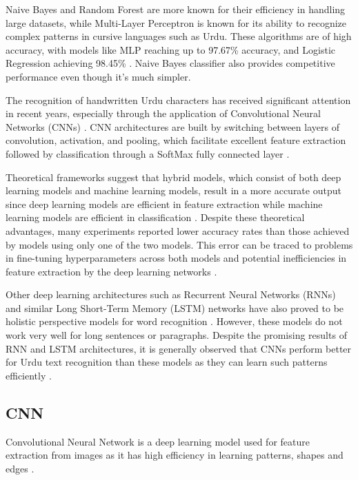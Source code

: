 \documentclass[11pt,twocolumn,twoside]{article} %
\begin{document}
Naive Bayes and Random Forest are more known for their efficiency in handling large datasets, while Multi-Layer Perceptron is known for its ability to recognize complex patterns in cursive languages such as Urdu. These algorithms are of high accuracy, with models like MLP reaching up to 97.67\% accuracy, and Logistic Regression achieving 98.45\% \cite{rizvi2018ocr}. Naive Bayes classifier also provides competitive performance even though it's much simpler.

The recognition of handwritten Urdu characters has received significant attention in recent years, especially through the application of Convolutional Neural Networks (CNNs) \cite{alrobah2022arabic}. CNN architectures are built by switching between layers of convolution, activation, and pooling, which facilitate excellent feature extraction followed by classification through a SoftMax fully connected layer \cite{alrobah2022arabic}.

Theoretical frameworks suggest that hybrid models, which consist of both deep learning models and machine learning models, result in a more accurate output since deep learning models are efficient in feature extraction while machine learning models are efficient in classification \cite{alrobah2022arabic}. Despite these theoretical advantages, many experiments reported lower accuracy rates than those achieved by models using only one of the two models. This error can be traced to problems in fine-tuning hyperparameters across both models and potential inefficiencies in feature extraction by the deep learning networks \cite{alrobah2022arabic}.

Other deep learning architectures such as Recurrent Neural Networks (RNNs) and similar Long Short-Term Memory (LSTM) networks have also proved to be holistic perspective models for word recognition \cite{alrobah2022arabic}. However, these models do not work very well for long sentences or paragraphs. Despite the promising results of RNN and LSTM architectures, it is generally observed that CNNs perform better for Urdu text recognition than these models as they can learn such patterns efficiently \cite{alrobah2022arabic}.

\subsection{CNN}

Convolutional Neural Network is a deep learning model used for feature extraction from images as it has high efficiency in learning patterns, shapes and edges \cite{alzubaidi2021review}.
\end{document}
